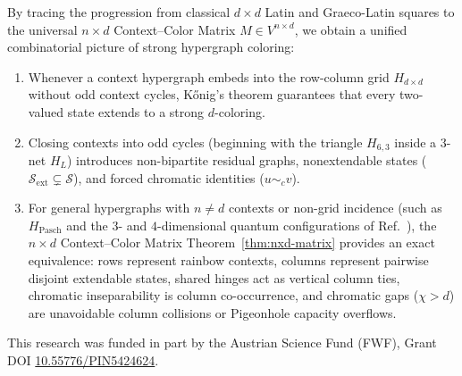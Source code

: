 \documentclass[aps,pra,reprint,superscriptaddress,longbibliography,nofootinbib,floatfix,10pt]{revtex4-2}
\theoremstyle{definition}\newtheorem{definition}[theorem]{Definition}
\theoremstyle{remark}\newtheorem{remark}[theorem]{Remark}
\newcommand{\Sc}{\mathcal S}\newcommand{\Cc}{\mathcal C}
\begin{document}
By tracing the progression from classical $d\times d$ Latin and Graeco-Latin squares to the universal $n\times d$ Context--Color Matrix $M\in V^{n\times d}$, we obtain a unified combinatorial picture of strong hypergraph coloring:
\begin{enumerate}
\item Whenever a context hypergraph embeds into the row-column grid $H_{d\times d}$ without odd context cycles, K\H{o}nig's theorem guarantees that every two-valued state extends to a strong $d$-coloring.
\item Closing contexts into odd cycles (beginning with the triangle $H_{6,3}$ inside a $3$-net $H_L$) introduces non-bipartite residual graphs, nonextendable states ($\Sc_{\mathrm{ext}}\subsetneq\Sc$), and forced chromatic identities ($u\sim_c v$).
\item For general hypergraphs with $n\neq d$ contexts or non-grid incidence (such as $H_{\mathrm{Pasch}}$ and the $3$- and $4$-dimensional quantum configurations of Ref.~\cite{svozil-2025-color}), the $n\times d$ Context--Color Matrix Theorem~\ref{thm:nxd-matrix} provides an exact equivalence: rows represent rainbow contexts, columns represent pairwise disjoint extendable states, shared hinges act as vertical column ties, chromatic inseparability is column co-occurrence, and chromatic gaps ($\chi>d$) are unavoidable column collisions or Pigeonhole capacity overflows.
\end{enumerate}

\begin{acknowledgments}
This research was funded in part by the Austrian Science Fund (FWF), Grant DOI \href{https://doi.org/10.55776/PIN5424624}{10.55776/PIN5424624}.
\end{acknowledgments}



\end{document}
